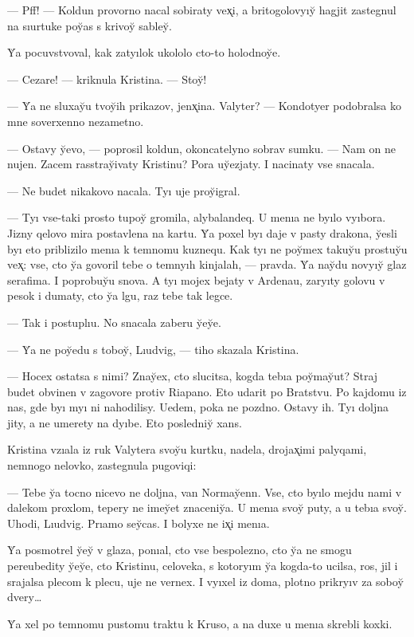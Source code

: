 \documentclass[10pt]{book}
\begin{document}
— Pff! — Koldun provorno nacal sobiraty vex̨i, a britogolovyıy̆ hagjit zastegnul na sıurtuke poy̆as s krivoy̆ sabley̆.

Y̆a pocuvstvoval, kak zatyılok ukololo cto-to holodnoy̆e.

— Cezare! — kriknula Kristina. — Stoy̆!

— Y̆a ne sluxay̆u tvoy̆ih prikazov, jenx̨ina. Valyter? — Kondotyer podobralsa ko mne soverxenno nezametno.

— Ostavy y̆evo, — poprosil koldun, okoncatelyno sobrav sumku. — Nam on ne nujen. Zacem rasstray̆ivaty Kristinu? Pora uy̆ezjaty. I nacinaty vse snacala.

— Ne budet nikakovo nacala. Tyı uje proy̆igral.

— Tyı vse-taki prosto tupoy̆ gromila, alybalandeq. U menıa ne byılo vyıbora. Jizny qelovo mira postavlena na kartu. Y̆a poxel byı daje v pasty drakona, y̆esli byı eto priblizilo menıa k temnomu kuznequ. Kak tyı ne poy̆mex takuy̆u prostuy̆u vex̨: vse, cto y̆a govoril tebe o temnyıh kinjalah, — pravda. Y̆a nay̆du novyıy̆ glaz serafima. I poprobuy̆u snova. A tyı mojex bejaty v Ardenau, zaryıty golovu v pesok i dumaty, cto y̆a lgu, raz tebe tak legce.

— Tak i postuplıu. No snacala zaberu y̆ey̆e.

— Y̆a ne poy̆edu s toboy̆, Lıudvig, — tiho skazala Kristina.

— Hocex ostatsa s nimi? Znay̆ex, cto slucitsa, kogda tebıa poy̆may̆ut? Straj budet obvinen v zagovore protiv Riapano. Eto udarit po Bratstvu. Po kajdomu iz nas, gde byı myı ni nahodilisy. Uedem, poka ne pozdno. Ostavy ih. Tyı doljna jity, a ne umerety na dyıbe. Eto posledniy̆ xans.

Kristina vzıala iz ruk Valytera svoy̆u kurtku, nadela, drojax̨imi palyqami, nemnogo nelovko, zastegnula pugoviqi:

— Tebe y̆a tocno nicevo ne doljna, van Normay̆enn. Vse, cto byılo mejdu nami v dalekom proxlom, tepery ne imey̆et znaceniy̆a. U menıa svoy̆ puty, a u tebıa svoy̆. Uhodi, Lıudvig. Prıamo sey̆cas. I bolyxe ne ix̨i menıa.

Y̆a posmotrel y̆ey̆ v glaza, ponıal, cto vse bespolezno, cto y̆a ne smogu pereubedity y̆ey̆e, cto Kristinu, celoveka, s kotoryım y̆a kogda-to ucilsa, ros, jil i srajalsa plecom k plecu, uje ne vernex. I vyıxel iz doma, plotno prikryıv za soboy̆ dvery…

Y̆a xel po temnomu pustomu traktu k Kruso, a na duxe u menıa skrebli koxki.
\end{document}
